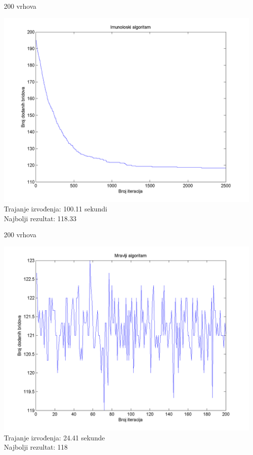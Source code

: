 \documentclass{beamer}
\begin{document}
\begin{frame}{200 vrhova}
\begin{center}
\includegraphics[scale = 0.4]{Im200.png}\\
Trajanje izvođenja: 100.11 sekundi\\
Najbolji rezultat: 118.33\\
\end{center}
\end{frame}

\begin{frame}{200 vrhova}
\begin{center}
\includegraphics[scale = 0.4]{Mr200.png}\\
Trajanje izvođenja: 24.41 sekunde\\
Najbolji rezultat: 118\\
\end{center}
\end{frame}
\end{document}
